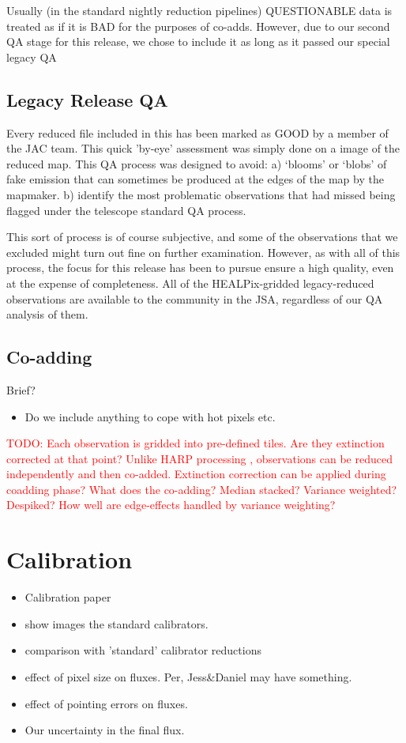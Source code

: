 \documentclass[usenatbib]{mn2e}
\newcommand{\todo}[1]{\textcolor{red}{TODO: #1}}
\begin{document}
Usually (in the standard nightly reduction pipelines) QUESTIONABLE
data is treated as if it is BAD for the purposes of co-adds. However,
due to our second QA stage for this release, we chose to include it as
long as it passed our special legacy QA

\subsection{Legacy Release QA}

Every reduced file included in this has been marked as GOOD by a
member of the JAC team. This quick 'by-eye' assessment was simply done
on a image of the reduced map. This QA process was designed to avoid:
a) `blooms' or `blobs' of fake emission that can sometimes be produced
at the edges of the map by the mapmaker.  b) identify the most
problematic observations that had missed being flagged under the
telescope standard QA process.

This sort of process is of course subjective, and some of the
observations that we excluded might turn out fine on further
examination. However, as with all of this process, the focus for this
release has been to pursue ensure a high quality, even at the expense
of completeness. All of the HEALPix-gridded legacy-reduced
observations are available to the community in the JSA, regardless of
our QA analysis of them.


\subsection{Co-adding}
Brief?
\begin{itemize}
\item Do we include anything to cope with hot pixels etc.
\end{itemize}

\todo{Each observation is gridded into pre-defined tiles. Are they
  extinction corrected at that point? Unlike HARP processing
  \citep{2015ACSISDR}, observations can be reduced independently and
  then co-added. Extinction correction can be applied during coadding
  phase? What does the co-adding? Median stacked? Variance weighted?
  Despiked? How well are edge-effects handled by variance weighting?}


\section{Calibration}
\begin{itemize}
\item Calibration paper \citep{Dempsey2013}
\item show images the standard calibrators.
\item comparison with 'standard' calibrator reductions
\item effect of pixel size on fluxes. Per, Jess\&Daniel may have something.
\item effect of pointing errors on fluxes.
\item Our uncertainty in the final flux.
\end{itemize}
\end{document}
